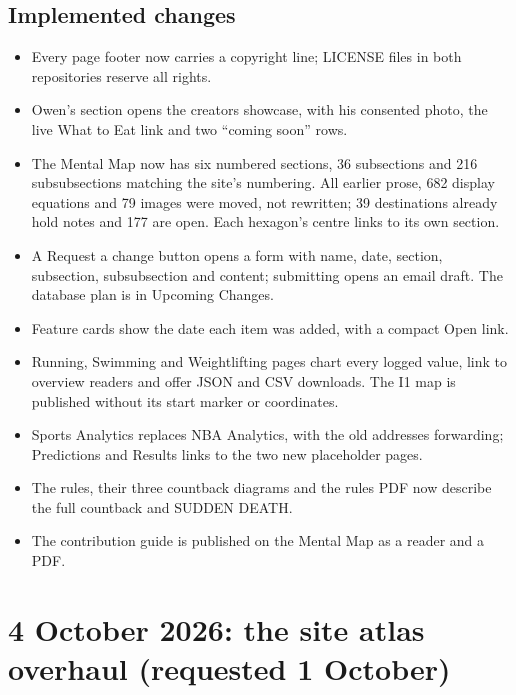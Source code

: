 \documentclass[11pt]{article}
\begin{document}
\subsection{Implemented changes}
\begin{itemize}
\item Every page footer now carries a copyright line; LICENSE files in both repositories reserve all rights.
\item Owen's section opens the creators showcase, with his consented photo, the live What to Eat link and two ``coming soon'' rows.
\item The Mental Map now has six numbered sections, 36 subsections and 216 subsubsections matching the site's numbering. All earlier prose, 682 display equations and 79 images were moved, not rewritten; 39 destinations already hold notes and 177 are open. Each hexagon's centre links to its own section.
\item A Request a change button opens a form with name, date, section, subsection, subsubsection and content; submitting opens an email draft. The database plan is in Upcoming Changes.
\item Feature cards show the date each item was added, with a compact Open link.
\item Running, Swimming and Weightlifting pages chart every logged value, link to overview readers and offer JSON and CSV downloads. The I1 map is published without its start marker or coordinates.
\item Sports Analytics replaces NBA Analytics, with the old addresses forwarding; Predictions and Results links to the two new placeholder pages.
\item The rules, their three countback diagrams and the rules PDF now describe the full countback and SUDDEN DEATH.
\item The contribution guide is published on the Mental Map as a reader and a PDF.
\end{itemize}

\section{4 October 2026: the site atlas overhaul (requested 1 October)}
\end{document}
